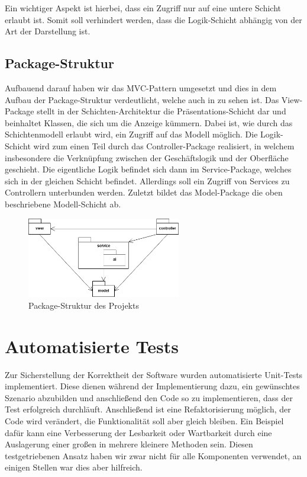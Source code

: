 Ein wichtiger Aspekt ist hierbei, dass ein Zugriff nur auf eine untere Schicht erlaubt ist.
Somit soll verhindert werden, dass die Logik-Schicht \bspw abhängig von der Art der Darstellung ist. \\

\subsection{Package-Struktur}
\label{subsec:package-struktur}

Aufbauend darauf haben wir das \ac{MVC}-Pattern umgesetzt und dies in dem Aufbau der Package-Struktur verdeutlicht,
welche auch in  zu sehen ist.
Das View-Package stellt in der Schichten-Architektur die Präsentations-Schicht dar und beinhaltet Klassen, die sich um
die Anzeige kümmern.
Dabei ist, wie durch das Schichtenmodell erlaubt wird, ein Zugriff auf das Modell möglich.
Die Logik-Schicht wird zum einen Teil durch das Controller-Package realisiert, in welchem insbesondere die Verknüpfung
zwischen der Geschäftslogik und der Oberfläche geschieht.
Die eigentliche Logik befindet sich dann im Service-Package, welches sich in der gleichen Schicht befindet.
Allerdings soll ein Zugriff von Services zu Controllern unterbunden werden.
Zuletzt bildet das Model-Package die oben beschriebene Modell-Schicht ab.

\begin{figure}[htb]
\centering
\includegraphics[width=0.6\textwidth]{Bilder/Diagramm_Paketstruktur.png}
\caption{Package-Struktur des Projekts}
\label{fig:package-struktur}
\end{figure}

\section{Automatisierte Tests}
\label{sec:tests}

Zur Sicherstellung der Korrektheit der Software wurden automatisierte Unit-Tests  implementiert.
Diese dienen während der Implementierung dazu, ein gewünschtes Szenario abzubilden und anschließend den Code so zu
implementieren, dass der Test erfolgreich durchläuft.
Anschließend ist eine Refaktorisierung möglich, \dasheisst der Code wird verändert, die Funktionalität soll aber gleich
bleiben.
Ein Beispiel dafür kann eine Verbesserung der Lesbarkeit oder Wartbarkeit durch eine Auslagerung einer großen in
mehrere kleinere Methoden sein.
Diesen testgetriebenen Ansatz  haben wir zwar nicht für alle Komponenten verwendet, an einigen Stellen war dies
aber hilfreich. \\

